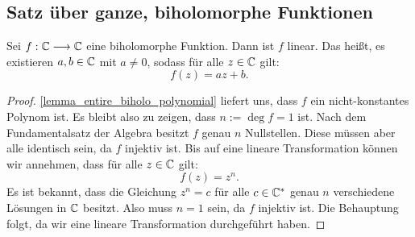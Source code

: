 \subsection{Satz über ganze, biholomorphe Funktionen}
\begin{theorem} \label{theorem_entire_biholo}
	Sei \(f:\mathbb{C}\longrightarrow \mathbb{C}\) eine biholomorphe Funktion. Dann ist \(f\) linear. Das heißt, es existieren \(a,b\in\mathbb{C}\) mit \(a\neq 0\), sodass für alle \(z\in\mathbb{C}\) gilt: 
	\[f(z)=az+b.\] 
\end{theorem}
\begin{proof}
	\cref{lemma_entire_biholo_polynomial} liefert uns, dass \(f\) ein nicht-konstantes Polynom ist. Es bleibt also zu zeigen, dass \(n:=\deg f =1\) ist. Nach dem Fundamentalsatz der Algebra besitzt \(f\) genau \(n\) Nullstellen. Diese müssen aber alle identisch sein, da \(f\) injektiv ist. Bis auf eine lineare Transformation können wir annehmen, dass für alle \(z\in \mathbb{C}\) gilt: \[f(z)=z^n.\]
	Es ist bekannt, dass die Gleichung \(z^n=c\) für alle \(c\in\mathbb{C}^\ast\) genau $n$ verschiedene Lösungen in \(\mathbb{C}\) besitzt. Also muss \(n=1\) sein, da \(f\) injektiv ist. Die Behauptung folgt, da wir eine lineare Transformation durchgeführt haben.
\end{proof}
